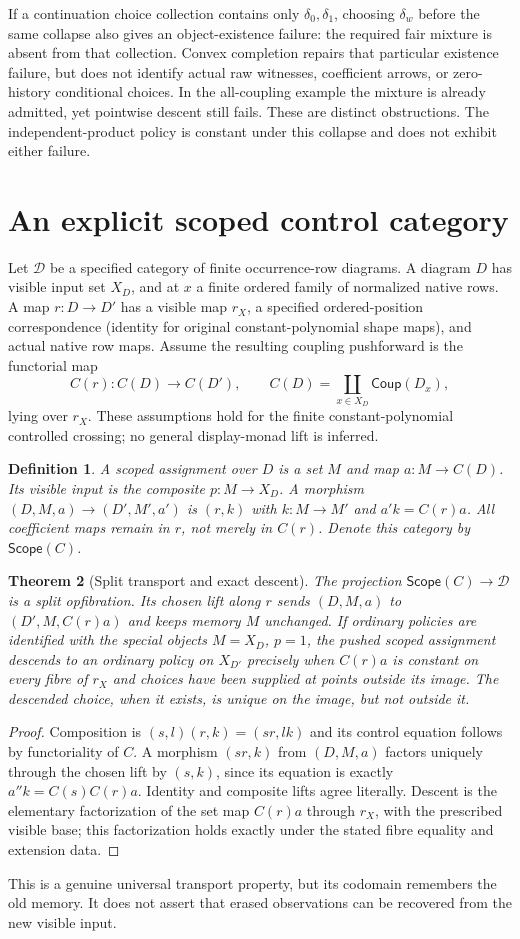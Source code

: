 \documentclass[11pt]{article}
\newtheorem{theorem}{Theorem}\newtheorem{proposition}[theorem]{Proposition}\newtheorem{definition}[theorem]{Definition}
\begin{document}
If a continuation choice collection contains only $\delta_0,\delta_1$, choosing $\delta_w$ before the same collapse also gives an object-existence failure: the required fair mixture is absent from that collection. Convex completion repairs that particular existence failure, but does not identify actual raw witnesses, coefficient arrows, or zero-history conditional choices. In the all-coupling example the mixture is already admitted, yet pointwise descent still fails. These are distinct obstructions. The independent-product policy is constant under this collapse and does not exhibit either failure.

\section{An explicit scoped control category}
Let $\mathscr D$ be a specified category of finite occurrence-row diagrams. A diagram $D$ has visible input set $X_D$, and at $x$ a finite ordered family of normalized native rows. A map $r:D\to D'$ has a visible map $r_X$, a specified ordered-position correspondence (identity for original constant-polynomial shape maps), and actual native row maps. Assume the resulting coupling pushforward is the functorial map
\[
 C(r):C(D)\to C(D'),\qquad C(D)=\coprod_{x\in X_D}\mathsf{Coup}(D_x),
\]
lying over $r_X$. These assumptions hold for the finite constant-polynomial controlled crossing; no general display-monad lift is inferred.

\begin{definition}
A scoped assignment over $D$ is a set $M$ and map $a:M\to C(D)$. Its visible input is the composite $p:M\to X_D$. A morphism $(D,M,a)\to(D',M',a')$ is $(r,k)$ with $k:M\to M'$ and $a'k=C(r)a$. All coefficient maps remain in $r$, not merely in $C(r)$. Denote this category by $\mathsf{Scope}(C)$.
\end{definition}
\begin{theorem}[Split transport and exact descent]
The projection $\mathsf{Scope}(C)\to\mathscr D$ is a split opfibration. Its chosen lift along $r$ sends $(D,M,a)$ to $(D',M,C(r)a)$ and keeps memory $M$ unchanged. If ordinary policies are identified with the special objects $M=X_D$, $p=1$, the pushed scoped assignment descends to an ordinary policy on $X_{D'}$ precisely when $C(r)a$ is constant on every fibre of $r_X$ and choices have been supplied at points outside its image. The descended choice, when it exists, is unique on the image, but not outside it.
\end{theorem}
\begin{proof}
Composition is $(s,l)(r,k)=(sr,lk)$ and its control equation follows by functoriality of $C$. A morphism $(sr,k)$ from $(D,M,a)$ factors uniquely through the chosen lift by $(s,k)$, since its equation is exactly $a''k=C(s)C(r)a$. Identity and composite lifts agree literally. Descent is the elementary factorization of the set map $C(r)a$ through $r_X$, with the prescribed visible base; this factorization holds exactly under the stated fibre equality and extension data.\end{proof}
This is a genuine universal transport property, but its codomain remembers the old memory. It does not assert that erased observations can be recovered from the new visible input.
\end{document}
